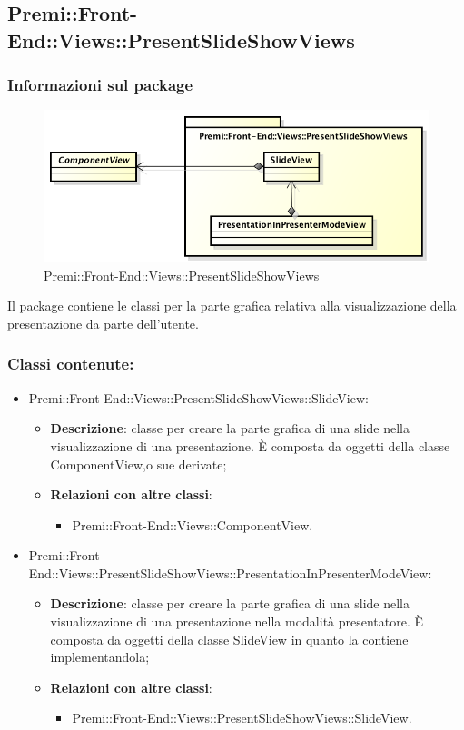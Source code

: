 \subsection{Premi::Front-End::Views::PresentSlideShowViews}
	\subsubsection*{Informazioni sul package}
	\begin{figure}[h]
		\centering
		\includegraphics[width=0.7\linewidth]{img/front-end_views_presentslideshowviews}
		\caption[Premi::Front-End::Views::PresentSlideShowViews]{Premi::Front-End::Views::PresentSlideShowViews}
	\end{figure}
	Il package contiene le classi per la parte grafica relativa alla visualizzazione della presentazione da parte dell'utente.

	\subsubsection*{Classi contenute:}
		\begin{itemize}
			\item Premi::Front-End::Views::PresentSlideShowViews::SlideView:
			\begin{itemize}
				\item \textbf{Descrizione}: classe per creare la parte grafica di una \gls{slide} nella visualizzazione di una presentazione. È composta da oggetti della classe ComponentView,o sue derivate;
				\item \textbf{Relazioni con altre classi}:
				\begin{itemize}
					\item Premi::Front-End::Views::ComponentView.
				\end{itemize}
			\end{itemize}

			\item Premi::Front-End::Views::PresentSlideShowViews::PresentationInPresenterModeView:
			\begin{itemize}
				\item \textbf{Descrizione}: classe per creare la parte grafica di una \gls{slide} nella visualizzazione di una presentazione nella modalità presentatore. È composta da oggetti della classe SlideView in quanto la contiene implementandola;
				\item \textbf{Relazioni con altre classi}:
				\begin{itemize}
					\item Premi::Front-End::Views::PresentSlideShowViews::SlideView.
				\end{itemize}
			\end{itemize}
		\end{itemize}

